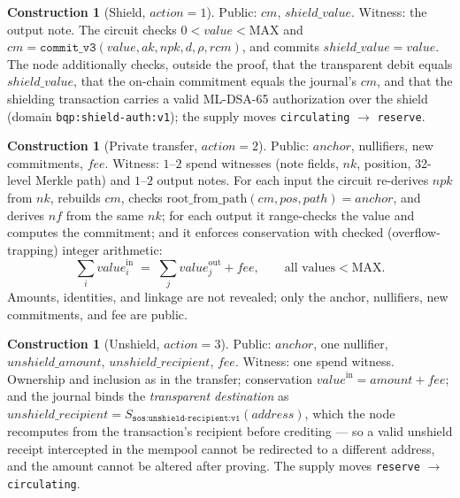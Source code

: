 \documentclass[11pt]{article}
\newcommand{\code}[1]{\texttt{#1}}
\newcommand{\mldsa}{ML\mbox{-}DSA\mbox{-}65}
\theoremstyle{plain}
\theoremstyle{definition}
\newtheorem{construction}[theorem]{Construction}
\theoremstyle{remark}
\begin{document}
\begin{construction}[Shield, $\mathit{action}=1$]
Public: $\mathit{cm}$, $\mathit{shield\_value}$. Witness: the output note.
The circuit checks $0 < \mathit{value} < \mathrm{MAX}$ and
$\mathit{cm} = \code{commit\_v3}(\mathit{value}, \mathit{ak}, \mathit{npk},
d, \rho, \mathit{rcm})$, and commits
$\mathit{shield\_value} = \mathit{value}$. The node additionally checks,
outside the proof, that the transparent debit equals
$\mathit{shield\_value}$, that the on-chain commitment equals the journal's
$\mathit{cm}$, and that the shielding transaction carries a valid \mldsa{}
authorization over the shield (domain \code{bqp:shield-auth:v1}); the supply
moves \code{circulating} $\to$ \code{reserve}.
\end{construction}

\begin{construction}[Private transfer, $\mathit{action}=2$]
Public: $\mathit{anchor}$, nullifiers, new commitments, $\mathit{fee}$.
Witness: $1$--$2$ spend witnesses (note fields, $\mathit{nk}$, position,
32-level Merkle path) and $1$--$2$ output notes. For each input the circuit
re-derives $\mathit{npk}$ from $\mathit{nk}$, rebuilds $\mathit{cm}$, checks
$\mathrm{root\_from\_path}(\mathit{cm}, \mathit{pos}, \mathit{path}) =
\mathit{anchor}$, and derives $\mathit{nf}$ from the same $\mathit{nk}$; for
each output it range-checks the value and computes the commitment; and it
enforces conservation with checked (overflow-trapping) integer arithmetic:
\[
\sum_i \mathit{value}^{\mathrm{in}}_i \;=\;
\sum_j \mathit{value}^{\mathrm{out}}_j + \mathit{fee},
\qquad \text{all values} < \mathrm{MAX}.
\]
Amounts, identities, and linkage are not revealed; only the anchor,
nullifiers, new commitments, and fee are public.
\end{construction}

\begin{construction}[Unshield, $\mathit{action}=3$]
Public: $\mathit{anchor}$, one nullifier, $\mathit{unshield\_amount}$,
$\mathit{unshield\_recipient}$, $\mathit{fee}$. Witness: one spend witness.
Ownership and inclusion as in the transfer; conservation
$\mathit{value}^{\mathrm{in}} = \mathit{amount} + \mathit{fee}$; and the
journal binds the \emph{transparent destination} as
$\mathit{unshield\_recipient} =
S_{\code{sos:unshield-recipient:v1}}(\mathit{address})$, which the node
recomputes from the transaction's recipient before crediting --- so a valid
unshield receipt intercepted in the mempool cannot be redirected to a
different address, and the amount cannot be altered after proving. The
supply moves \code{reserve} $\to$ \code{circulating}.
\end{construction}
\end{document}
